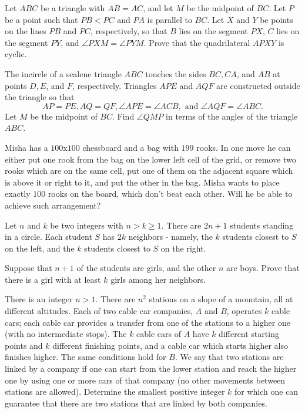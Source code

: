 \documentclass[11pt]{scrartcl}
\begin{document}
\begin{problem}[883811987981100]
Let $ABC$ be a triangle with $AB=AC$, and let $M$ be the midpoint of $BC$. Let $P$ be a point such that $PB<PC$ and $PA$ is parallel to $BC$. Let $X$ and $Y$ be points on the lines $PB$ and $PC$, respectively, so that $B$ lies on the segment $PX$, $C$ lies on the segment $PY$, and $\angle PXM=\angle PYM$. Prove that the quadrilateral $APXY$ is cyclic.
\end{problem}
\begin{problem}[221552874820768]
The incircle of a scalene triangle $ABC$ touches the sides $BC, CA$, and $AB$ at points $D, E$, and $F$, respectively. Triangles $APE$ and $AQF$ are constructed outside the triangle so that\[AP =PE, AQ=QF, \angle APE=\angle ACB,\text{ and }\angle AQF =\angle ABC.\]Let $M$ be the midpoint of $BC$. Find $\angle QMP$ in terms of the angles of the triangle $ABC$.
\end{problem}
\begin{problem}[614247648874042]
Misha has a $100$x$100$ chessboard and a bag with $199$ rooks. In one move he can either put one rook from the bag on the lower left cell of the grid, or remove two rooks which are on the same cell, put one of them on the adjacent square which is above it or right to it, and put the other in the bag. Misha wants to place exactly $100$ rooks on the board, which don't beat each other. Will he be able to achieve such arrangement?
\end{problem}
\begin{problem}[3866807698726339637]
Let $n$ and $k$ be two integers with $n>k\geqslant 1$. There are $2n+1$ students standing in a circle. Each student $S$ has $2k$ neighbors - namely, the $k$ students closest to $S$ on the left, and the $k$ students closest to $S$ on the right.

Suppose that $n+1$ of the students are girls, and the other $n$ are boys. Prove that there is a girl with at least $k$ girls among her neighbors.
\end{problem}
\begin{problem}[695330092247108707]
There is an integer $n > 1$. There are $n^2$ stations on a slope of a mountain, all at different altitudes. Each of two cable car companies, $A$ and $B$, operates $k$ cable cars; each cable car provides a transfer from one of the stations to a higher one (with no intermediate stops). The $k$ cable cars of $A$ have $k$ different starting points and $k$ different finishing points, and a cable car which starts higher also finishes higher. The same conditions hold for $B$. We say that two stations are linked by a company if one can start from the lower station and reach the higher one by using one or more cars of that company (no other movements between stations are allowed). Determine the smallest positive integer $k$ for which one can guarantee that there are two stations that are linked by both companies.
\end{problem}
\end{document}
